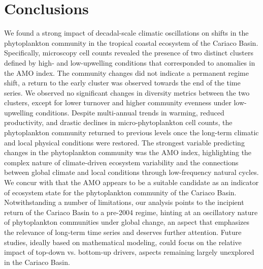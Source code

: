 \documentclass[draft]{agujournal2019}
\begin{document}
    

\section{Conclusions}
    We found a strong impact of decadal-scale climatic oscillations on shifts in the phytoplankton community in the tropical coastal ecosystem of the Cariaco Basin. Specifically, microscopy cell counts revealed the presence of two distinct clusters defined by high- and low-upwelling conditions that corresponded to anomalies in the AMO index. The community changes did not indicate a permanent regime shift, a return to the early cluster was observed towards the end of the time series. We observed no significant changes in diversity metrics between the two clusters, except for lower turnover and higher community evenness under low-upwelling conditions.
    Despite multi-annual trends in warming, reduced productivity, and drastic declines in micro-phytoplankton cell counts, the phytoplankton community returned to previous levels once the long-term climatic and local physical conditions were restored. 
    The strongest variable predicting changes in the phytoplankton community was the AMO index, highlighting the complex nature of climate-driven ecosystem variability and the connections between global climate and local conditions through low-frequency natural cycles. We concur with  that the AMO appears to be a suitable candidate as an indicator of ecosystem state for the phytoplankton community of the Cariaco Basin. 
    Notwithstanding a number of limitations, our analysis points to the incipient return of the Cariaco Basin to a pre-2004 regime, hinting at an oscillatory nature of phytoplankton communities under global change, an aspect that emphasizes the relevance of long-term time series and deserves further attention. 
    Future studies, ideally based on mathematical modeling, could focus on the relative impact of top-down vs. bottom-up drivers,  aspects remaining largely unexplored in the Cariaco Basin.
    
    
    
    


\end{document}
